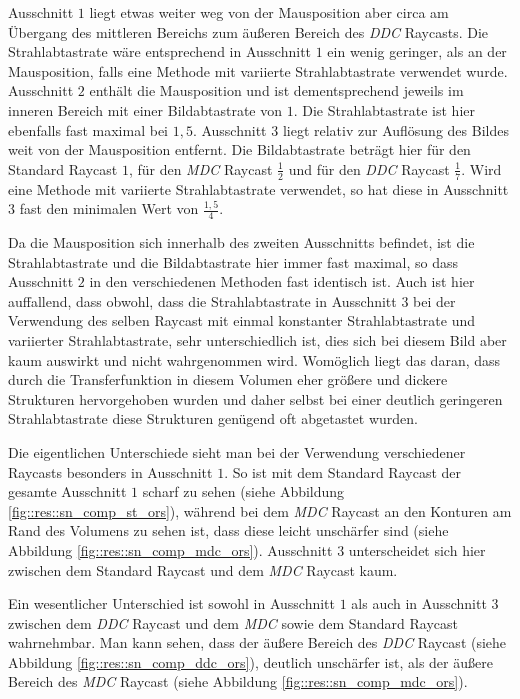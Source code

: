 Ausschnitt $1$ liegt etwas weiter weg von der Mausposition aber circa am Übergang des mittleren Bereichs zum äußeren Bereich des \emph{DDC} Raycasts.
Die Strahlabtastrate wäre entsprechend in Ausschnitt $1$ ein wenig geringer, als an der Mausposition, falls eine Methode mit variierte Strahlabtastrate verwendet wurde.
Ausschnitt $2$ enthält die Mausposition und ist dementsprechend jeweils im inneren Bereich mit einer Bildabtastrate von $1$.
Die Strahlabtastrate ist hier ebenfalls fast maximal bei $1,5$.
Ausschnitt $3$ liegt relativ zur Auflösung des Bildes weit von der Mausposition entfernt.
Die Bildabtastrate beträgt hier für den Standard Raycast $1$, für den \emph{MDC} Raycast $\frac{1}{2}$ und für den \emph{DDC} Raycast $\frac{1}{7}$.
Wird eine Methode mit variierte Strahlabtastrate verwendet, so hat diese in Ausschnitt $3$ fast den minimalen Wert von $\frac{1,5}{4}$.

Da die Mausposition sich innerhalb des zweiten Ausschnitts befindet, ist die Strahlabtastrate und die Bildabtastrate hier immer fast maximal, so dass Ausschnitt $2$ in den verschiedenen Methoden fast identisch ist.
Auch ist hier auffallend, dass obwohl, dass die Strahlabtastrate in Ausschnitt $3$ bei der Verwendung des selben Raycast mit einmal konstanter Strahlabtastrate und variierter Strahlabtastrate, sehr unterschiedlich ist, dies sich bei diesem Bild aber kaum auswirkt und nicht wahrgenommen wird.
Womöglich liegt das daran, dass durch die Transferfunktion in diesem Volumen eher größere und dickere Strukturen hervorgehoben wurden und daher selbst bei einer deutlich geringeren Strahlabtastrate diese Strukturen genügend oft abgetastet wurden.

Die eigentlichen Unterschiede sieht man bei der Verwendung verschiedener Raycasts besonders in Ausschnitt $1$.
So ist mit dem Standard Raycast der gesamte Ausschnitt $1$ scharf zu sehen (siehe Abbildung \ref{fig::res::sn_comp_st_ors}), während bei dem \emph{MDC} Raycast an den Konturen am Rand des Volumens zu sehen ist, dass diese leicht unschärfer sind (siehe Abbildung \ref{fig::res::sn_comp_mdc_ors}).
Ausschnitt $3$ unterscheidet sich hier zwischen dem Standard Raycast und dem \emph{MDC} Raycast kaum.

Ein wesentlicher Unterschied ist sowohl in Ausschnitt $1$ als auch in Ausschnitt $3$ zwischen dem \emph{DDC} Raycast und dem \emph{MDC} sowie dem Standard Raycast wahrnehmbar.
Man kann sehen, dass der äußere Bereich des \emph{DDC} Raycast (siehe Abbildung \ref{fig::res::sn_comp_ddc_ors}), deutlich unschärfer ist, als der äußere Bereich des \emph{MDC} Raycast (siehe Abbildung \ref{fig::res::sn_comp_mdc_ors}).

